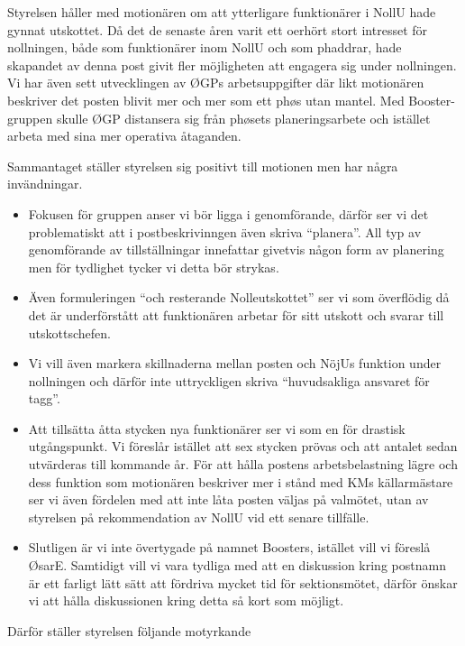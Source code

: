 \documentclass[../_main/handlingar.tex]{subfiles}
\begin{document}
\motionssvar

Styrelsen håller med motionären om att ytterligare funktionärer i NollU hade gynnat utskottet. 
Då det de senaste åren varit ett oerhört stort intresset för nollningen, både som funktionärer inom NollU och som phaddrar, hade skapandet av denna post givit fler möjligheten att engagera sig under nollningen. Vi har även sett utvecklingen av ØGPs arbetsuppgifter där likt motionären beskriver det posten blivit mer och mer som ett phøs utan mantel. Med Booster-gruppen skulle ØGP distansera sig från phøsets planeringsarbete och istället arbeta med sina mer operativa åtaganden. 

Sammantaget ställer styrelsen sig positivt till motionen men har några invändningar. 

\begin{itemize}
    \item Fokusen för gruppen anser vi bör ligga i genomförande, därför ser vi det problematiskt att i postbeskrivinngen även skriva “planera”. All typ av genomförande av tillställningar innefattar givetvis någon form av planering men för tydlighet tycker vi detta bör strykas. 
    \item Även formuleringen “och resterande Nolleutskottet” ser vi som överflödig då det är underförstått att funktionären arbetar för sitt utskott och svarar till utskottschefen. 
    \item Vi vill även markera skillnaderna mellan posten och NöjUs funktion under nollningen och därför inte uttryckligen skriva “huvudsakliga ansvaret för tagg”.
    \item Att tillsätta åtta stycken nya funktionärer ser vi som en för drastisk utgångspunkt. Vi föreslår istället att sex stycken prövas och att antalet sedan utvärderas till kommande år. För att hålla postens arbetsbelastning lägre och dess funktion som motionären beskriver mer i stånd med KMs källarmästare ser vi även fördelen med att inte låta posten väljas på valmötet, utan av styrelsen på rekommendation av NollU vid ett senare tillfälle.
    \item Slutligen är vi inte övertygade på namnet Boosters, istället vill vi föreslå ØsarE. Samtidigt vill vi vara tydliga med att en diskussion kring postnamn är ett farligt lätt sätt att fördriva mycket tid för sektionsmötet, därför önskar vi att hålla diskussionen kring detta så kort som möjligt. 
\end{itemize}

Därför ställer styrelsen följande motyrkande
\end{document}

